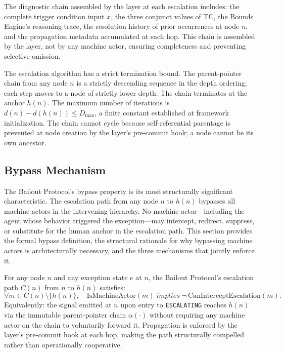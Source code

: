The diagnostic chain assembled by the \fact{} layer at each escalation includes: the complete trigger condition input $x$, the three conjunct values of TC, the Bounds Engine's reasoning trace, the resolution history of prior occurrences at node $n$, and the propagation metadata accumulated at each hop. This chain is assembled by the \fact{} layer, not by any machine actor, ensuring completeness and preventing selective omission.

The escalation algorithm has a strict termination bound. The parent-pointer chain from any node $n$ is a strictly descending sequence in the depth ordering; each step moves to a node of strictly lower depth. The chain terminates at the anchor $h(n)$. The maximum number of iterations is $d(n) - d(h(n)) \leq D_{\max}$, a finite constant established at framework initialization. The chain cannot cycle because self-referential parentage is prevented at node creation by the \fact{} layer's pre-commit hook; a node cannot be its own ancestor.

\subsection{Bypass Mechanism}
\label{sec:bp-bypass}

The Bailout Protocol's bypass property is its most structurally significant characteristic. The escalation path from any node $n$ to $h(n)$ bypasses all machine actors in the intervening hierarchy. No machine actor---including the agent whose behavior triggered the exception---may intercept, redirect, suppress, or substitute for the human anchor in the escalation path. This section provides the formal bypass definition, the structural rationale for why bypassing machine actors is architecturally necessary, and the three mechanisms that jointly enforce it.

\begin{definition}
\label{def:bypass}
For any node $n$ and any exception state $e$ at $n$, the Bailout Protocol's escalation path $C(n)$ from $n$ to $h(n)$ satisfies:
\begin{equation}
\forall m \in C(n) \setminus \{h(n)\},\quad
\text{IsMachineActor}(m) \; implies\; \neg\ \text{CanInterceptEscalation}(m).
\tag{BP-1}
\end{equation}
Equivalently: the signal emitted at $n$ upon entry to \texttt{ESCALATING} reaches $h(n)$ via the immutable parent-pointer chain $\alpha(\cdot)$ without requiring any machine actor on the chain to voluntarily forward it. Propagation is enforced by the \fact{} layer's pre-commit hook at each hop, making the path structurally compelled rather than operationally cooperative.
\end{definition}


